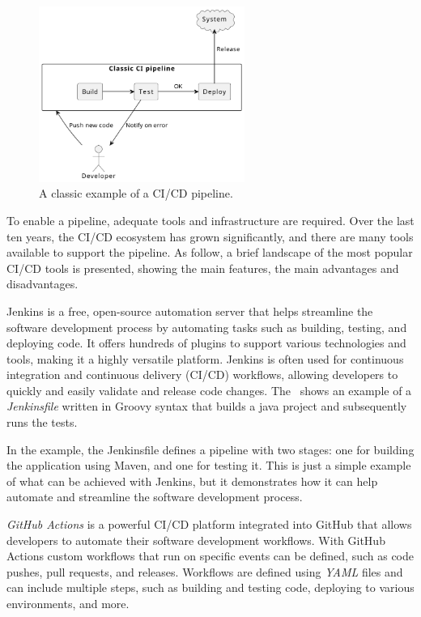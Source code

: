 \begin{figure}[ht]
	\centering
	\includegraphics[width=0.6\textwidth]{figures/cicd-example.pdf}
	\caption{A classic example of a CI/CD pipeline.}
	\label{fig:ci-cd}
\end{figure}

To enable a pipeline, adequate tools and infrastructure are required. Over the last ten years, the CI/CD ecosystem has grown significantly,
and there are many tools available to support the pipeline.
As follow, a brief landscape of the most popular CI/CD tools is presented, showing the main features, the main advantages and disadvantages.

Jenkins is a free, open-source automation server that helps streamline the software development process by automating tasks such as building,
testing, and deploying code. It offers hundreds of plugins to support various technologies and tools, making it a highly versatile platform. Jenkins
is often used for continuous integration and continuous delivery (CI/CD) workflows, allowing developers to quickly and easily validate and release
code changes. The~ shows an example of a \emph{Jenkinsfile} written in Groovy syntax that builds a java project and
subsequently runs the tests.

In the example, the Jenkinsfile defines a pipeline with two stages: one for building the application using Maven, and one for testing it. This is
just a simple example of what can be achieved with Jenkins, but it demonstrates how it can help automate and streamline the software development
process.



\emph{GitHub Actions} is a powerful CI/CD platform integrated into GitHub that allows developers to automate their software development workflows.
With GitHub Actions custom workflows that run on specific events can be defined, such as code pushes, pull requests, and releases. Workflows are
defined using \emph{YAML} files and can include multiple steps, such as building and testing code, deploying to various environments, and more.


